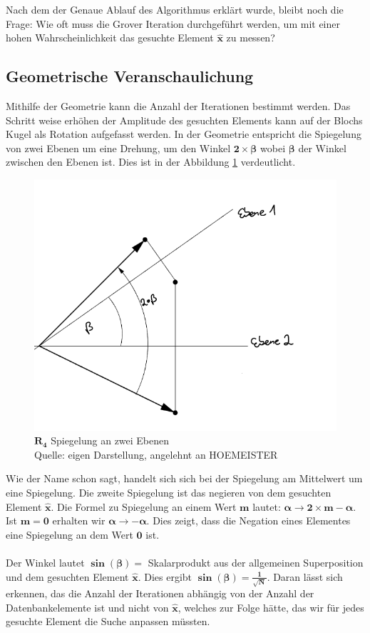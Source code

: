 Nach dem der Genaue Ablauf des Algorithmus erklärt wurde, bleibt noch die Frage: Wie oft muss die Grover Iteration durchgeführt werden, um mit einer hohen Wahrscheinlichkeit das gesuchte Element $\mathbf{\hat{x}}$ zu messen?

\subsection{Geometrische Veranschaulichung}
Mithilfe der Geometrie kann die Anzahl der Iterationen bestimmt werden. Das Schritt weise erhöhen der Amplitude des gesuchten Elements kann auf der Blochs Kugel als Rotation aufgefasst werden. In der Geometrie entspricht die Spiegelung von zwei Ebenen um eine Drehung, um den Winkel $\mathbf{2 \times \beta}$ wobei $\mathbf{\beta}$ der Winkel zwischen den Ebenen ist. Dies ist in der Abbildung \ref{fig:zweiEbenen} verdeutlicht.
 \begin{figure}[hbtp]
	\centering
	\includegraphics[width=.6\textwidth]{figures/zweiEbenen.png}
	\caption{$\mathbf{R_4}$ Spiegelung an zwei Ebenen \\ Quelle: eigen Darstellung, angelehnt an HOEMEISTER}
	\label{fig:zweiEbenen}
\end{figure} 
Wie der Name schon sagt, handelt sich sich bei der Spiegelung am Mittelwert um eine Spiegelung. Die zweite Spiegelung ist das negieren von dem gesuchten Element $\mathbf{\hat{x}}$. Die Formel zu Spiegelung an einem Wert $\mathbf{m}$ lautet: $\mathbf{\alpha \rightarrow 2 \times m - \alpha}$. Ist $\mathbf{m=0}$ erhalten wir $\mathbf{\alpha \rightarrow - \alpha}$. Dies zeigt, dass die Negation eines Elementes eine Spiegelung an dem Wert $\mathbf{0}$ ist.
\\ 
\\
Der Winkel lautet $\mathbf{\sin(\beta) = }$  Skalarprodukt aus der allgemeinen Superposition und dem gesuchten Element $\mathbf{\hat{x}}$. Dies ergibt  $\mathbf{\sin(\beta) = \frac{1}{\sqrt N}}$. Daran lässt sich erkennen, das die Anzahl der Iterationen abhängig von der Anzahl der Datenbankelemente ist und nicht von $\mathbf{\hat{x}}$, welches zur Folge hätte, das wir für jedes gesuchte Element die Suche anpassen müssten.
